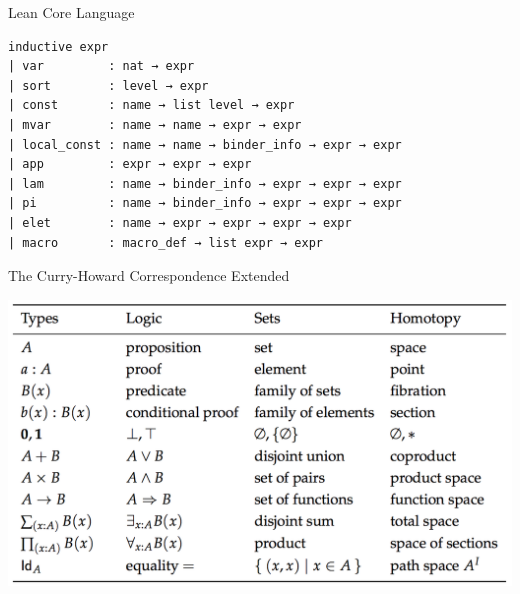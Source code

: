 \documentclass[pdf]{beamer}
\begin{document}

\begin{frame}[fragile]{Lean Core Language}
  \begin{verbatim}
inductive expr
| var         : nat → expr
| sort        : level → expr
| const       : name → list level → expr
| mvar        : name → name → expr → expr
| local_const : name → name → binder_info → expr → expr
| app         : expr → expr → expr
| lam         : name → binder_info → expr → expr → expr
| pi          : name → binder_info → expr → expr → expr
| elet        : name → expr → expr → expr → expr
| macro       : macro_def → list expr → expr
  \end{verbatim}
\end{frame}

\begin{frame}{The Curry-Howard Correspondence Extended\footnotemark[3]}
  \begin{center}
    \includegraphics[scale=0.47]{images/hott}
  \end{center}
\end{frame}
\end{document}
